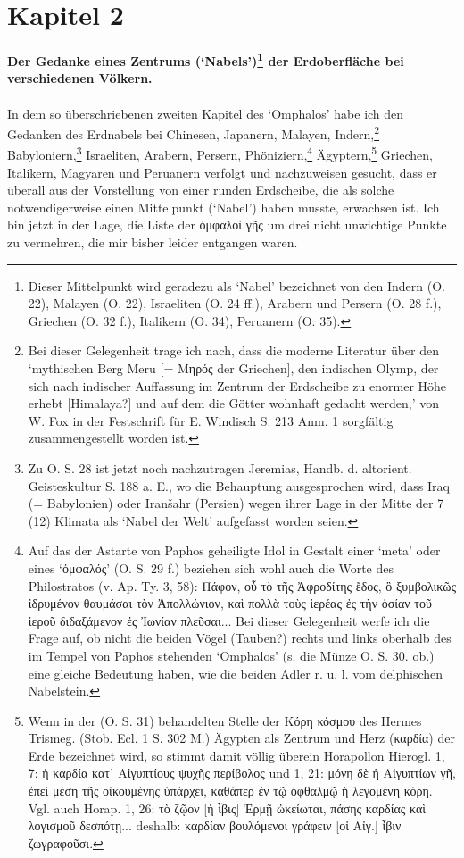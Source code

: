 \documentclass[a4paper, 11pt, oneside]{article}
\begin{document}
\section{Kapitel 2}
\begin{center}
\textbf{Der Gedanke eines Zentrums (`Nabels')\footnote{Dieser Mittelpunkt wird geradezu als `Nabel' bezeichnet von den Indern (O. 22), Malayen (O. 22), Israeliten (O. 24 ff.), Arabern und Persern (O. 28 f.), Griechen (O. 32 f.), Italikern (O. 34), Peruanern (O. 35).} der Erdoberfläche bei verschiedenen Völkern.}
\end{center}
\paragraph{}
In dem so überschriebenen zweiten Kapitel des `Omphalos' habe ich den Gedanken des Erdnabels bei Chinesen, Japanern, Malayen, Indern,\footnote{Bei dieser Gelegenheit trage ich nach, dass die moderne Literatur über den `mythischen Berg Meru [= Μηρός der Griechen], den indischen Olymp, der sich nach indischer Auffassung im Zentrum der Erdscheibe zu enormer Höhe erhebt [Himalaya?] und auf dem die Götter wohnhaft gedacht werden,' von W. Fox in der Festschrift für E. Windisch S. 213 Anm. 1 sorgfältig zusammengestellt worden ist.} Babyloniern,\footnote{Zu O. S. 28 ist jetzt noch nachzutragen Jeremias, Handb. d. altorient. Geisteskultur S. 188 a. E., wo die Behauptung ausgesprochen wird, dass Iraq (= Babylonien) oder Iranšahr (Persien) wegen ihrer Lage in der Mitte der 7 (12) Klimata als `Nabel der Welt' aufgefasst worden seien.} Israeliten, Arabern, Persern, Phöniziern,\footnote{Auf das der Astarte von Paphos geheiligte Idol in Gestalt einer `meta' oder eines `ὀμφαλός' (O. S. 29 f.) beziehen sich wohl auch die Worte des Philostratos (v. Ap. Ty. 3, 58): Πάφον, οὗ τὸ τῆς Ἀφροδίτης ἔδος, ὃ ξυμβολικῶς ἰδρυμένον θαυμάσαι τὸν Ἀπολλώνιον, καὶ πολλὰ τοὺς ἱερέας ἐς τὴν ὁσίαν τοῦ ἱεροῦ διδαξάμενον ἐς Ἰωνίαν πλεῦσαι... Bei dieser Gelegenheit werfe ich die Frage auf, ob nicht die beiden Vögel (Tauben?) rechts und links oberhalb des im Tempel von Paphos stehenden `Omphalos' (s. die Münze O. S. 30. ob.) eine gleiche Bedeutung haben, wie die beiden Adler r. u. l. vom delphischen Nabelstein.} Ägyptern,\footnote{Wenn in der (O. S. 31) behandelten Stelle der Κόρη κόσμου des Hermes Trismeg. (Stob. Ecl. 1 S. 302 M.) Ägypten als Zentrum und Herz (καρδία) der Erde bezeichnet wird, so stimmt damit völlig überein Horapollon Hierogl. 1, 7: ἡ καρδία κατ᾿ Αἰγυπτίους ψυχῆς περίβολος und 1, 21: μόνη δὲ ἡ Αἰγυπτίων γῆ, ἐπεὶ μέση τῆς οἰκουμένης ὑπάρχει, καθάπερ ἐν τῷ ὀφθαλμῷ ἡ λεγομένη κόρη. Vgl. auch Horap. 1, 26: τὸ ζῷον [ἡ ἶβις] Ἑρμῇ ὠκείωται, πάσης καρδίας καὶ λογισμοῦ δεσπότῃ... deshalb: καρδίαν βουλόμενοι γράφειν [οἱ Αἰγ.] ἶβιν ζωγραφοῦσι.} Griechen, Italikern, Magyaren und Peruanern verfolgt und nachzuweisen gesucht, dass er überall aus der Vorstellung von einer runden Erdscheibe, die als solche notwendigerweise einen Mittelpunkt (`Nabel') haben musste, erwachsen ist. Ich bin jetzt in der Lage, die Liste der ὀμφαλοὶ γῆς um drei nicht unwichtige Punkte zu vermehren, die mir bisher leider entgangen waren.
\end{document}
